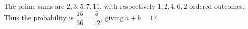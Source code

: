 The prime sums are $2,3,5,7,11$, with respectively $1,2,4,6,2$ ordered outcomes. Thus the probability is $\dfrac{15}{36}=\dfrac{5}{12}$, giving $\boxed{a+b=17}$.
